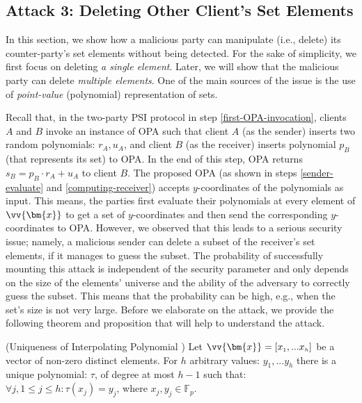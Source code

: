 \subsection{Attack 3: Deleting Other Client's Set Elements}

 In this section, we show how a malicious party can manipulate (i.e., delete) its counter-party's set elements without being detected. For the sake of simplicity, we first focus on deleting \emph{a single element}. Later, we will show that the malicious party can  delete \emph{multiple elements}. One of the main sources of the issue is the use of \emph{point-value} (polynomial) representation of sets.



Recall that, in the two-party PSI protocol in step \ref{first-OPA-invocation}, clients $A$ and $B$ invoke an instance of OPA such that client $A$ (as the sender) inserts  two random polynomials: $r_{\scriptscriptstyle A}, u_{\scriptscriptstyle A}$, and client $B$  (as the receiver) inserts polynomial $p_{\scriptscriptstyle B}$ (that represents its set) to OPA. In the end of this step,  OPA returns  $s_{\scriptscriptstyle B}=p_{\scriptscriptstyle B}\cdot r_{\scriptscriptstyle A}+u_{\scriptscriptstyle A}$ to client $B$.  The proposed OPA (as shown in steps \ref{sender-evaluate} and \ref{computing-receiver})  accepts  $y$-coordinates of the polynomials as input.  This means, the parties first evaluate their polynomials at every element of $\vv{\bm{x}}$ to get a set of $y$-coordinates and then send the corresponding $y$-coordinates to  OPA. However, we observed that this leads to a serious security issue; namely, a malicious sender can delete a subset of the receiver's set elements, if it manages to guess the subset. The probability of successfully mounting this attack is independent of the security parameter and only depends on the size of the elements' universe and the ability of the adversary to correctly guess the subset. This means that the probability can be high, e.g., when the set's size is not very large. Before we elaborate on the attack, we provide the following  theorem and proposition that will help to understand the attack. 

\begin{theorem}\label{theorem:Uniqueness-Interp-Poly}(Uniqueness of Interpolating Polynomial \cite{quarteroni2010numerical})
 Let $\vv{\bm{x}}= [x_{\scriptscriptstyle 1},...x_{\scriptscriptstyle h}]$ be a vector of non-zero distinct elements. For $h$ arbitrary values: $y_{\scriptscriptstyle 1},...y_{\scriptscriptstyle h}$ there is a unique polynomial: $\tau$, of degree at most $h-1$ such that: $\forall j, 1\leq j\leq h: \tau(x_{\scriptscriptstyle j})=y_{\scriptscriptstyle j}$,
 where $x_{\scriptscriptstyle j},y_{\scriptscriptstyle j}\in \mathbb{F}_{p}$.
\end{theorem}

